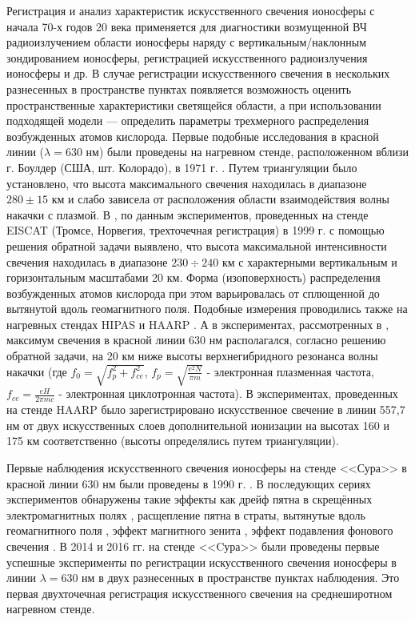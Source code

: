 \documentclass[12pt,a4paper]{article}
\begin{document}
Регистрация и анализ характеристик искусственного свечения ионосферы с начала 70-х годов 20 века \cite{BIONDI1970} применяется для диагностики возмущенной ВЧ радиоизлучением области ионосферы наряду с вертикальным/наклонным зондированием ионосферы, регистрацией искусственного радиоизлучения ионосферы и др. В случае регистрации искусственного свечения в нескольких разнесенных в пространстве пунктах появляется возможность оценить пространственные характеристики светящейся области, а при использовании подходящей модели --- определить параметры трехмерного распределения возбужденных атомов кислорода. Первые подобные исследования в красной линии ($\lambda = 630$ нм) были проведены на нагревном стенде, расположенном вблизи г. Боулдер (США, шт. Колорадо), в 1971 г. \cite{HASLETT1974}. Путем триангуляции было установлено, что высота максимального свечения находилась в диапазоне $280\pm15$ км и слабо зависела от расположения области взаимодействия волны накачки с плазмой. В \cite{Gustavsson2001}, по данным экспериментов, проведенных на стенде EISCAT (Тромсе, Норвегия, трехточечная регистрация) в 1999 г. с помощью решения обратной задачи выявлено, что высота максимальной интенсивности свечения находилась в диапазоне $230\div240$ км с характерными вертикальным и горизонтальным масштабами 20 км. Форма (изоповерхность) распределения возбужденных атомов кислорода при этом варьировалась от сплющенной до вытянутой вдоль геомагнитного поля. Подобные измерения проводились также на нагревных стендах HIPAS \cite{Gustavsson2008} и HAARP \cite{Pedersen2011}. А в экспериментах, рассмотренных в \cite{Gustavsson2008}, максимум свечения в красной линии 630 нм располагался, согласно решению обратной задачи, на 20 км ниже высоты верхнегибридного резонанса волны накачки (где $f_0 = \sqrt{f_p^2 + f_{ce}^2}$, $f_p=\sqrt{\frac{e^2N}{\pi m}}$ - электронная плазменная частота, $f_{ce}=\frac{e H}{2\pi m c}$ - электронная циклотронная частота). В экспериментах, проведенных на стенде HAARP \cite{Pedersen2011} было зарегистрировано искусственное свечение в линии 557,7 нм от двух искусственных слоев дополнительной ионизации на высотах 160 и 175 км соответственно (высоты определялись путем триангуляции).

Первые наблюдения искусственного свечения ионосферы на стенде <<Сура>> в красной линии 630 нм были проведены в 1990 г. \cite{BERNHARDTSCALESGRACHEtAl1991}. В последующих сериях экспериментов обнаружены такие эффекты как дрейф пятна в скрещённых электромагнитных полях \cite{BernhardtWongHubaEtAl2000}, расщепление пятна в страты, вытянутые вдоль геомагнитного поля \cite{GrachKoschYashnovEtAl2007, Grach2012}, эффект магнитного зенита \cite{Grach2012, Shindin2014}, эффект подавления фонового свечения \cite{Grach2012, Shindin2014, Klimenko2017}. В 2014 и 2016 гг. на стенде <<Cура>> были проведены первые успешные эксперименты по регистрации искусственного свечения ионосферы в линии $\lambda = 630$ нм в двух разнесенных в пространстве пунктах наблюдения. Это первая двухточечная регистрация искусственного свечения на среднеширотном нагревном стенде.
\end{document}

